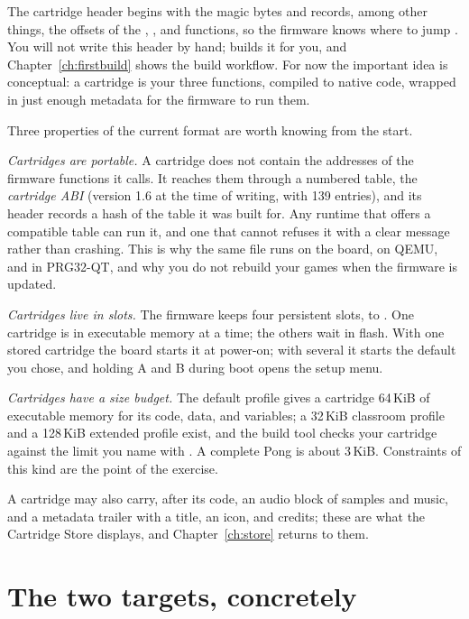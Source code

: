 The cartridge header begins with the magic bytes  and records, among
other things, the offsets of the , , and 
functions, so the firmware knows where to jump \citep{prg32cartfmt}. You will not
write this header by hand;  builds it for you,
and Chapter~\ref{ch:firstbuild} shows the build workflow. For now the
important idea is conceptual: a cartridge is your three functions, compiled to
native code, wrapped in just enough metadata for the firmware to run them.

Three properties of the current format are worth knowing from the start.

\emph{Cartridges are portable.} A cartridge does not contain the addresses of
the firmware functions it calls. It reaches them through a numbered table, the
\emph{cartridge ABI} (version 1.6 at the time of writing, with 139 entries), and
its header records a hash of the table it was built for. Any runtime that offers
a compatible table can run it, and one that cannot refuses it with a clear
message rather than crashing. This is why the same file runs on the board, on
QEMU, and in PRG32-QT, and why you do not rebuild your games when the firmware
is updated.

\emph{Cartridges live in slots.} The firmware keeps four persistent slots,
 to . One cartridge is in executable memory at a time;
the others wait in flash. With one stored cartridge the board starts it at
power-on; with several it starts the default you chose, and holding A and B
during boot opens the setup menu.

\emph{Cartridges have a size budget.} The default profile gives a cartridge
64\,KiB of executable memory for its code, data, and variables; a 32\,KiB
classroom profile and a 128\,KiB extended profile exist, and the build tool
checks your cartridge against the limit you name with 
\citep{prg32profiles}. A complete Pong is about 3\,KiB. Constraints of this kind
are the point of the exercise.

A cartridge may also carry, after its code, an audio block of samples and
music, and a metadata trailer with a title, an icon, and credits; these are what
the Cartridge Store displays, and Chapter~\ref{ch:store} returns to them.

\section{The two targets, concretely}

